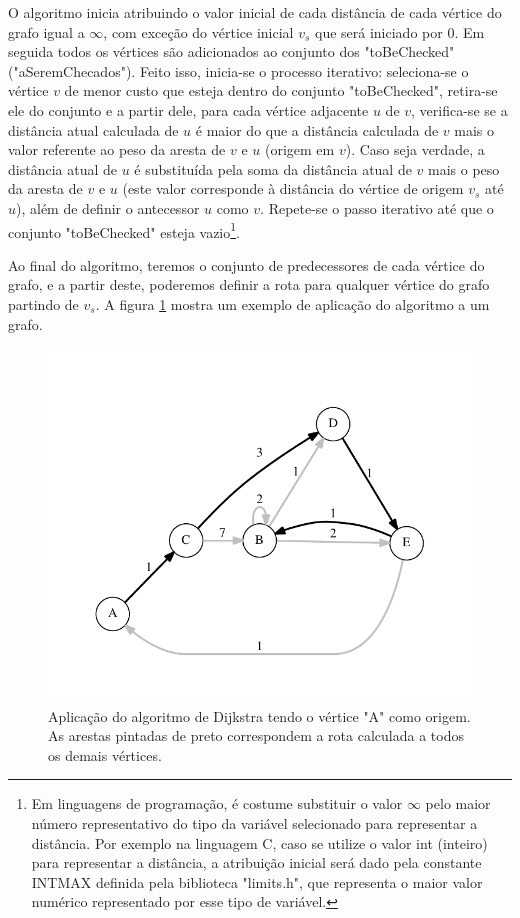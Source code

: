 O algoritmo inicia atribuindo o valor inicial de cada distância de cada vértice do grafo igual a $\infty$, com exceção do vértice inicial $v_{s}$ que será iniciado por 0. Em seguida todos os vértices são adicionados ao conjunto dos "toBeChecked" ("aSeremChecados"). Feito isso, inicia-se o processo iterativo: seleciona-se o vértice $v$ de menor custo que esteja dentro do conjunto "toBeChecked", retira-se ele do conjunto e a partir dele, para cada vértice adjacente $u$ de $v$, verifica-se se a distância atual calculada de $u$ é maior do que a distância calculada de $v$ mais o valor referente ao peso da aresta de $v$ e $u$ (origem em $v$). Caso seja verdade, a distância atual de $u$ é substituída pela soma da distância atual de $v$ mais o peso da aresta de $v$ e $u$ (este valor corresponde à distância do vértice de origem $v_{s}$ até $u$), além de definir o antecessor $u$ como $v$. Repete-se o passo iterativo até que o conjunto "toBeChecked" esteja vazio\footnote{Em linguagens de programação, é costume substituir o valor $\infty$ pelo maior número representativo do tipo da variável selecionado para representar a distância. Por exemplo na linguagem C, caso se utilize o valor int (inteiro) para representar a distância, a atribuição inicial será dado pela constante INT\underline{\space}MAX  definida pela biblioteca "limits.h", que representa o maior valor numérico representado por esse tipo de variável.}.

Ao final do algoritmo, teremos o conjunto de predecessores de cada vértice do grafo, e a partir deste, poderemos definir a rota para qualquer vértice do grafo partindo de $v_{s}$. A figura \ref{fig-dijkstra-algoritmo-grafo} mostra um exemplo de aplicação do algoritmo a um grafo.

\begin{figure}[H]
\centering
\includegraphics[width=1.\textwidth]{figuras/grafo-dijkstra} 
\caption{Aplicação do algoritmo de Dijkstra tendo o vértice "A" como origem. As arestas pintadas de preto correspondem a rota calculada a todos os demais vértices.}
\label{fig-dijkstra-algoritmo-grafo}
\end{figure}

